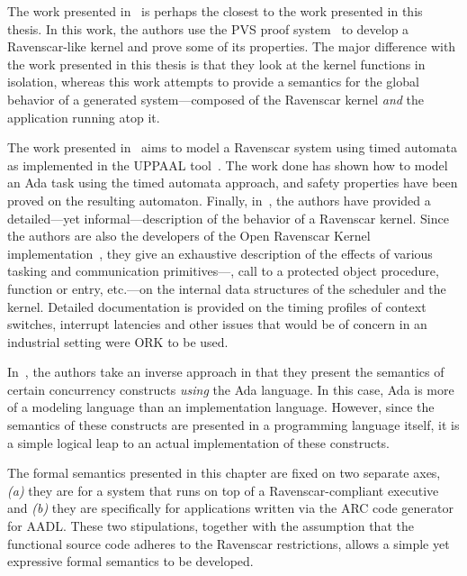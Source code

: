The work presented in~\cite{fowler@rtss97} is perhaps the closest to
the work presented in this thesis. In this work, the authors use the
PVS proof system~\cite{owre@cade11} to develop a Ravenscar-like kernel
and prove some of its properties. The major difference with the work
presented in this thesis is that they look at the kernel functions in
isolation, whereas this work attempts to provide a semantics for the
global behavior of a generated system---composed of the Ravenscar
kernel \emph{and} the application running atop it.

The work presented in~\cite{lundqvist@rtcsa99} aims to model a
Ravenscar system using timed automata as implemented in the UPPAAL
tool~\cite{larsen@jsttt97}. The work done has shown how to model an
Ada task using the timed automata approach, and safety properties have
been proved on the resulting automaton. Finally,
in~\cite{vardanega@rts05}, the authors have provided a detailed---yet
informal---description of the behavior of a Ravenscar kernel. Since
the authors are also the developers of the Open Ravenscar Kernel
implementation~\cite{puente@ae00}, they give an exhaustive description
of the effects of various tasking and communication
primitives---, call to a protected object procedure,
function or entry, etc.---on the internal data structures of the
scheduler and the kernel. Detailed documentation is provided on the
timing profiles of context switches, interrupt latencies and other
issues that would be of concern in an industrial setting were ORK to
be used.

In~\cite{peyre@ae07}, the authors take an inverse approach in that
they present the semantics of certain concurrency constructs
\emph{using} the Ada language. In this case, Ada is more of a modeling
language than an implementation language. However, since the semantics
of these constructs are presented in a programming language itself, it
is a simple logical leap to an actual implementation of these
constructs.

The formal semantics presented in this chapter are fixed on two
separate axes, \emph{(a)} they are for a system that runs on top of a
Ravenscar-compliant executive and \emph{(b)} they are specifically for
applications written via the ARC code generator for AADL. These two
stipulations, together with the assumption that the functional source
code adheres to the Ravenscar restrictions, allows a simple yet
expressive formal semantics to be developed.

